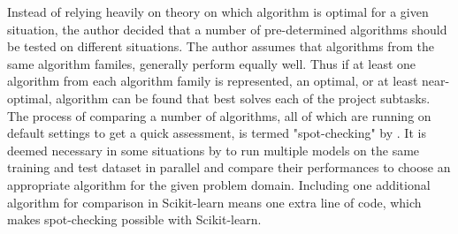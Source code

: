 	Instead of relying heavily on theory on which algorithm is optimal for a given situation, the author decided that a number of pre-determined algorithms should be tested on different situations. The author assumes that algorithms from the same algorithm familes, generally perform equally well. Thus if at least one algorithm from each algorithm family is represented, an optimal, or at least near-optimal, algorithm can be found that best solves each of the project subtasks. The process of comparing a number of algorithms, all of which are running on default settings to get a quick assessment, is termed "spot-checking" by \cite{WEBSITE:26}. It is deemed necessary in some situations by \cite{BOOK:6} to run multiple models on the same training and test dataset in parallel and compare their performances to choose an appropriate algorithm for the given problem domain. Including one additional algorithm for comparison in Scikit-learn means one extra line of code, which makes spot-checking possible with Scikit-learn. 

